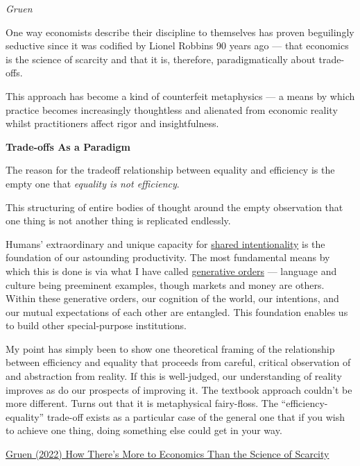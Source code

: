 \documentclass[
]{book}
\begin{document}
\emph{Gruen}

One way economists describe their discipline to themselves has proven beguilingly seductive since it was codified by Lionel Robbins 90 years ago --- that economics is the science of scarcity and that it is, therefore, paradigmatically about trade-offs.

This approach has become a kind of counterfeit metaphysics --- a means by which practice becomes increasingly thoughtless and alienated from economic reality whilst practitioners affect rigor and insightfulness.

\textbf{Trade-offs As a Paradigm}

The reason for the tradeoff relationship between equality and efficiency is the empty one that \emph{equality is not efficiency}.

This structuring of entire bodies of thought around the empty observation that one thing is not another thing is replicated endlessly.

Humans' extraordinary and unique capacity for \href{https://clubtroppo.com.au/2020/05/30/culture-and-language-as-public-goods/\#:~:text=Shared\%20intentionality\%3A\%20the\%20ultimate\%20form\%20of\%20sharing}{shared intentionality} is the foundation of our astounding productivity. The most fundamental means by which this is done is via what I have called \href{http://clubtroppo.com.au/2020/03/21/hierarchy-and-generative-orders-some-introductory-thoughts/}{generative orders} --- language and culture being preeminent examples, though markets and money are others. Within these generative orders, our cognition of the world, our intentions, and our mutual expectations of each other are entangled. This foundation enables us to build other special-purpose institutions.

My point has simply been to show one theoretical framing of the relationship between efficiency and equality that proceeds from careful, critical observation of and abstraction from reality. If this is well-judged, our understanding of reality improves as do our prospects of improving it. The textbook approach couldn't be more different. Turns out that it is metaphysical fairy-floss. The ``efficiency-equality'' trade-off exists as a particular case of the general one that if you wish to achieve one thing, doing something else could get in your way.

\href{https://evonomics.com/how-theres-more-to-economics-than-the-science-of-scarcity/}{Gruen (2022) How There's More to Economics Than the Science of Scarcity}
\end{document}
